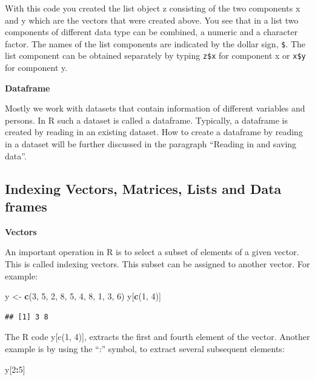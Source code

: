 \documentclass[]{book}
\newenvironment{Shaded}{\begin{snugshade}}{\end{snugshade}}
\newcommand{\KeywordTok}[1]{\textcolor[rgb]{0.13,0.29,0.53}{\textbf{#1}}}
\newcommand{\DecValTok}[1]{\textcolor[rgb]{0.00,0.00,0.81}{#1}}
\newcommand{\StringTok}[1]{\textcolor[rgb]{0.31,0.60,0.02}{#1}}
\newcommand{\OperatorTok}[1]{\textcolor[rgb]{0.81,0.36,0.00}{\textbf{#1}}}
\newcommand{\NormalTok}[1]{#1}
\begin{document}
With this code you created the list object z consisting of the two
components x and y which are the vectors that were created above. You
see that in a list two components of different data type can be
combined, a numeric and a character factor. The names of the list
components are indicated by the dollar sign, \texttt{\$}. The list
component can be obtained separately by typing \texttt{z\$x} for
component x or \texttt{x\$y} for component y.

\textbf{Dataframe}

Mostly we work with datasets that contain information of different
variables and persons. In R such a dataset is called a dataframe.
Typically, a dataframe is created by reading in an existing dataset. How
to create a dataframe by reading in a dataset will be further discussed
in the paragraph ``Reading in and saving data''.

\subsection{Indexing Vectors, Matrices, Lists and Data
frames}\label{indexing-vectors-matrices-lists-and-data-frames}

\textbf{Vectors}

An important operation in R is to select a subset of elements of a given
vector. This is called indexing vectors. This subset can be assigned to
another vector. For example:

\begin{Shaded}
\begin{Highlighting}[]
\NormalTok{y <-}\StringTok{ }\KeywordTok{c}\NormalTok{(}\DecValTok{3}\NormalTok{, }\DecValTok{5}\NormalTok{, }\DecValTok{2}\NormalTok{, }\DecValTok{8}\NormalTok{, }\DecValTok{5}\NormalTok{, }\DecValTok{4}\NormalTok{, }\DecValTok{8}\NormalTok{, }\DecValTok{1}\NormalTok{, }\DecValTok{3}\NormalTok{, }\DecValTok{6}\NormalTok{)}
\NormalTok{y[}\KeywordTok{c}\NormalTok{(}\DecValTok{1}\NormalTok{, }\DecValTok{4}\NormalTok{)]}
\end{Highlighting}
\end{Shaded}

\begin{verbatim}
## [1] 3 8
\end{verbatim}

The R code y{[}c(1, 4){]}, extracts the first and fourth element of the
vector. Another example is by using the ``:'' symbol, to extract several
subsequent elements:

\begin{Shaded}
\begin{Highlighting}[]
\NormalTok{y[}\DecValTok{2}\OperatorTok{:}\DecValTok{5}\NormalTok{]}
\end{Highlighting}
\end{Shaded}
\end{document}
